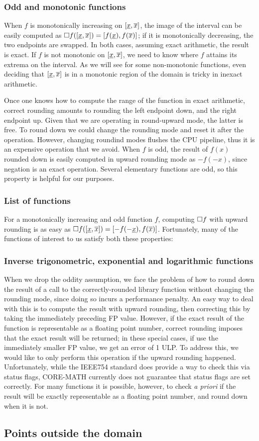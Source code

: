 \subsubsection{Odd and monotonic functions}
When $f$ is monotonically increasing on $[\underline{x}, \overline{x}]$, the image of the interval can be easily computed as $\Box f([\underline{x}, \overline{x}]) = [f(\underline{x}), f(\overline{x})]$; if it is monotonically decreasing, the two endpoints are swapped. In both cases, assuming exact arithmetic, the result is exact.
If $f$ is not monotonic on $[\underline{x}, \overline{x}]$, we need to know where $f$ attains its extrema on the interval. As we will see for some non-monotonic functions, even deciding that $[\underline{x}, \overline{x}]$ is in a monotonic region of the domain is tricky in inexact arithmetic.

Once one knows how to compute the range of the function in exact arithmetic, correct rounding amounts to rounding the left endpoint down, and the right endpoint up. Given that we are operating in round-upward mode, the latter is free. To round down we could change the rounding mode and reset it after the operation.
However, changing roundind modes flushes the CPU pipeline, thus it is an expensive operation that we avoid.
When $f$ is odd, the result of $f(x)$ rounded down is easily computed in upward rounding mode as $-f(-x)$, since negation is an exact operation. Several elementary functions are odd, so this property is helpful for our purposes.

\subsubsection{List of functions}
For a monotonically increasing and odd function $f$, computing $\Box f$ with upward rounding is as easy as $\Box f([\underline{x}, \overline{x}]) = [-f(-\underline{x}), f(\overline{x})]$. Fortunately, many of the functions of interest to us satisfy both these properties:

\subsubsection{Inverse trigonometric, exponential and logarithmic functions}
When we drop the oddity assumption, we face the problem of how to round down the result of a call to the correctly-rounded library function without changing the rounding mode, since doing so incurs a performance penalty.
An easy way to deal with this is to compute the result with upward rounding, then correcting this by taking the immediately preceding FP value.
However, if the exact result of the function is representable as a floating point number, correct rounding imposes that the exact result will be returned; in these special cases, if use the immediately smaller FP value, we get an error of 1 ULP.
To address this, we would like to only perform this operation if the upward rounding happened. Unfortunately, while the IEEE754 standard does provide a way to check this via status flags, CORE-MATH currently does not guarantee that status flags are set correctly.
For many functions it is possible, however, to check \emph{a priori} if the result will be exactly representable as a floating point number, and round down when it is not.

\FS{\dots}

\subsection{Points outside the domain}
